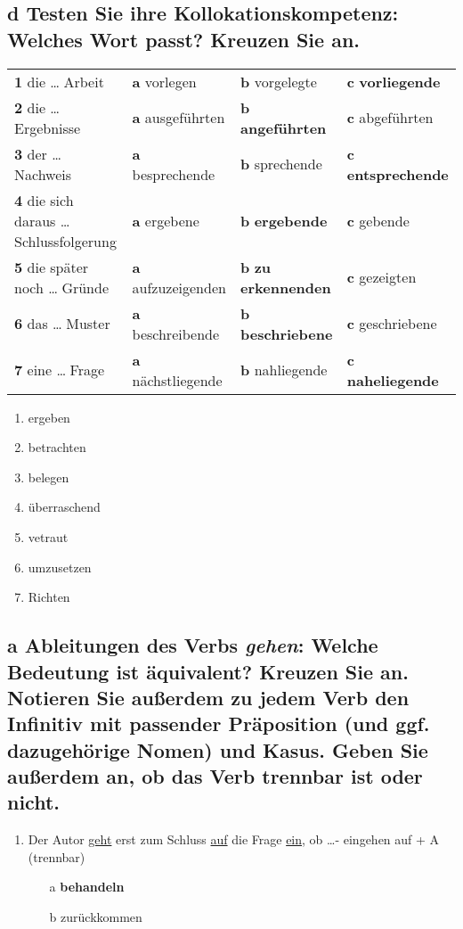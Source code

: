\documentclass{article}
\begin{document}
	\subsection{\textbf{d} Testen Sie ihre Kollokationskompetenz: Welches Wort passt? Kreuzen Sie an.}
	\begin{tabular}{ l  l  l  l }
		\textbf{1} die \dots $\;$Arbeit & \textbf{a} vorlegen & \textbf{b} vorgelegte & \textbf{c} \textbf{vorliegende} \\
		\textbf{2} die \dots $\;$Ergebnisse & \textbf{a} ausgeführten & \textbf{b} \textbf{angeführten} & \textbf{c} abgeführten \\
		\textbf{3} der \dots $\;$Nachweis & \textbf{a} besprechende & \textbf{b} sprechende & \textbf{c} \textbf{entsprechende} \\
		\textbf{4} die sich daraus \dots $\;$Schlussfolgerung & \textbf{a} ergebene & \textbf{b} \textbf{ergebende} & \textbf{c} gebende \\
		\textbf{5} die später noch \dots $\;$Gründe & \textbf{a} aufzuzeigenden & \textbf{b} \textbf{zu erkennenden} & \textbf{c} gezeigten \\
		\textbf{6} das \dots $\;$Muster & \textbf{a} beschreibende & \textbf{b} \textbf{beschriebene} & \textbf{c} geschriebene \\
		\textbf{7} eine \dots $\;$Frage & \textbf{a} nächstliegende & \textbf{b} nahliegende & \textbf{c} \textbf{naheliegende} \\
	\end{tabular}
	\begin{enumerate}
		\item{ergeben}
		\item{betrachten}
		\item{belegen}
		\item{überraschend}
		\item{vetraut}
		\item{umzusetzen}
		\item{Richten}
	\end{enumerate}
	\subsection{\textbf{a} Ableitungen des Verbs \textit{gehen}: Welche Bedeutung ist äquivalent? Kreuzen Sie an. Notieren Sie außerdem zu jedem Verb den Infinitiv mit passender Präposition (und ggf. dazugehörige Nomen) und Kasus. Geben Sie außerdem an, ob das Verb trennbar ist oder nicht.}
	\begin{enumerate}
		\item{Der Autor \underline{geht} erst zum Schluss \underline{auf} die Frage \underline{ein}, ob \dots - eingehen auf + A (trennbar)}
		\begin{itemize}
			\item[a]{\textbf{behandeln}}
			\item[b]{zurückkommen}
		\end{itemize}
	\end{enumerate}
\end{document}
